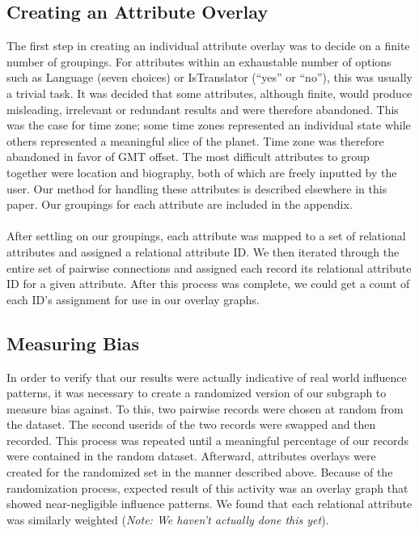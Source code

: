 \subsection{Creating an Attribute Overlay}
The first step in creating an individual attribute overlay was to decide on a finite number of groupings.  For attributes within an exhaustable number of options such as Language (seven choices) or  IsTranslator (``yes'' or ``no''), this was usually a trivial task.  It was decided that some attributes, although finite, would produce misleading, irrelevant or redundant results and were therefore abandoned.  This was the case for time zone; some time zones represented an individual state while others represented a meaningful slice of the planet.  Time zone was therefore abandoned in favor of GMT offset.  The most difficult attributes to group together were location and biography, both of which are freely inputted by the user.  Our method for handling these attributes is described elsewhere in this paper.  Our groupings for each attribute are included in the appendix.
\\\\
After settling on our groupings, each attribute was mapped to a set of relational attributes and assigned a relational attribute ID.  We then iterated through the entire set of pairwise connections and assigned each record its relational attribute ID for a given attribute.  After this process was complete, we could get a count of each ID's assignment for use in our overlay graphs.

\subsection{Measuring Bias}
In order to verify that our results were actually indicative of real world influence patterns, it was necessary to create a randomized version of our subgraph to measure bias against.  To this, two pairwise records were chosen at random from the dataset.  The second userids of the two records were swapped and then recorded.  This process was repeated until a meaningful percentage of our records were contained in the random dataset.  Afterward, attributes overlays were created for the randomized set in the manner described above.  Because of the randomization process, expected result of this activity was an overlay graph that showed near-negligible influence patterns.  We found that each relational attribute was similarly weighted (\textit{Note: We haven't actually done this yet}).